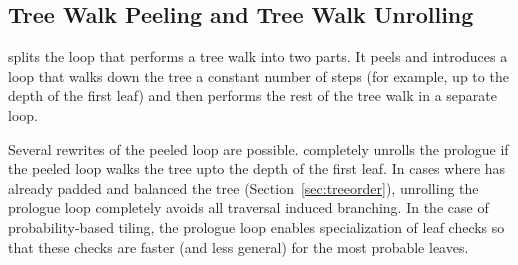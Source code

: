 \subsection{Tree Walk Peeling and Tree Walk Unrolling}
\Treebeard{} splits the loop that performs a tree walk into two parts. It peels 
and introduces a  loop that walks down the tree a constant number 
of steps (for example, up to the depth of the first leaf) and then performs the 
rest of the tree walk in a separate loop.



Several rewrites of the peeled loop are possible. \Treebeard{} completely 
unrolls the prologue if the peeled loop walks the tree upto the depth of the 
first leaf. In cases where \Treebeard{} has already padded and balanced the tree 
(Section~\ref{sec:treeorder}), unrolling the prologue loop completely avoids all 
traversal induced branching.  In the case of probability-based tiling, the 
prologue loop enables specialization of leaf checks so that these checks are 
faster (and less general) for the most probable leaves.



